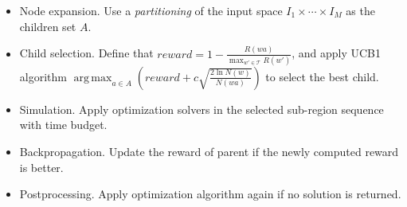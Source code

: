 \documentclass[a0paper,portrait]{baposter}
\DeclareMathOperator*{\argmax}{arg\,max}
\begin{document}
\begin{poster}
{\begin{itemize}
\vspace{-0.6em}
\item Node expansion. Use a \emph{partitioning} of the input space $I_{1}\times\cdots\times I_{M}$ as the children set $A$.
\vspace{-0.6em}

\item Child selection. Define that $reward = 1-\frac{R(wa)}{\max_{w'\in\mathcal{T}}R(w')}$, and apply UCB1 algorithm $\argmax_{a\in A} \left(reward + c\sqrt{\frac{2\ln N(w)}{N(wa)}}\right)$ to select the best child.
\vspace{-0.6em}

\item Simulation. Apply optimization solvers in the selected sub-region sequence with time budget.

\vspace{-0.6em}


\item Backpropagation. Update the reward of parent if the newly computed reward is better.

\vspace{-0.6em}

\item Postprocessing. Apply optimization algorithm again if no solution is returned.

\end{itemize}

}







\end{poster}
\end{document}
